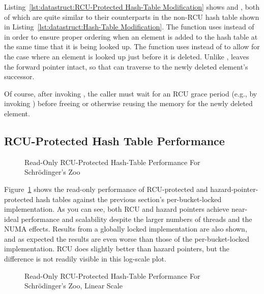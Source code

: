 Listing~\ref{lst:datastruct:RCU-Protected Hash-Table Modification}
shows  and , both of which
are quite similar to their counterparts in the non-RCU hash table
shown in
Listing~\ref{lst:datastruct:Hash-Table Modification}.
The  function uses  instead
of  in order to ensure proper ordering when
an element is added to the hash table at the same time that it is
being looked up.
The  function uses  instead
of  to allow for the case where an element is
looked up just before it is deleted.
Unlike ,  leaves the
forward pointer intact, so that  can traverse
to the newly deleted element's successor.

Of course, after invoking , the caller must wait for
an RCU grace period (e.g., by invoking ) before
freeing or otherwise reusing the memory for the newly deleted element.

\subsection{RCU-Protected Hash Table Performance}
\label{sec:datastruct:RCU-Protected Hash Table Performance}

\begin{figure}[tb]
\centering
{}
\caption{Read-Only RCU-Protected Hash-Table Performance For Schr\"odinger's Zoo}
\label{fig:datastruct:Read-Only RCU-Protected Hash-Table Performance For Schroedinger's Zoo}
\end{figure}

Figure~\ref{fig:datastruct:Read-Only RCU-Protected Hash-Table Performance For Schroedinger's Zoo}
shows the read-only performance of RCU-protected and hazard-pointer-protected
hash tables against the previous section's per-bucket-locked implementation.
As you can see, both RCU and hazard pointers achieve near-ideal performance
and scalability despite the larger numbers of threads and the NUMA effects.
Results from a globally locked implementation are also shown, and as expected
the results are even worse than those of the per-bucket-locked implementation.
RCU does slightly better than hazard pointers, but the difference is not
readily visible in this log-scale plot.

\begin{figure}[tb]
\centering
{}
\caption{Read-Only RCU-Protected Hash-Table Performance For Schr\"odinger's Zoo, Linear Scale}
\label{fig:datastruct:Read-Only RCU-Protected Hash-Table Performance For Schroedinger's Zoo, Linear Scale}
\end{figure}

